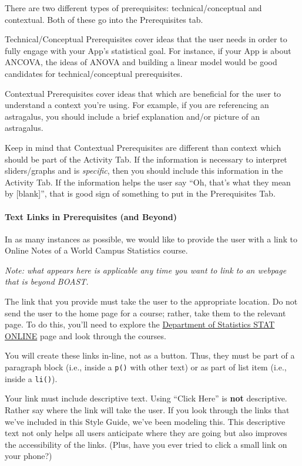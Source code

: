 \documentclass[
]{book}
\begin{document}
There are two different types of prerequisites: technical/conceptual and contextual. Both of these go into the Prerequisites tab.

Technical/Conceptual Prerequisites cover ideas that the user needs in order to fully engage with your App's statistical goal. For instance, if your App is about ANCOVA, the ideas of ANOVA and building a linear model would be good candidates for technical/conceptual prerequisites.

Contextual Prerequisites cover ideas that which are beneficial for the user to understand a context you're using. For example, if you are referencing an astragalus, you should include a brief explanation and/or picture of an astragalus.

Keep in mind that Contextual Prerequisites are different than context which should be part of the Activity Tab. If the information is necessary to interpret sliders/graphs and is \emph{specific}, then you should include this information in the Activity Tab. If the information helps the user say ``Oh, that's what they mean by {[}blank{]}'', that is good sign of something to put in the Prerequisites Tab.

\hypertarget{text-links-in-prerequisites-and-beyond}{%
\paragraph{Text Links in Prerequisites (and Beyond)}\label{text-links-in-prerequisites-and-beyond}}

In as many instances as possible, we would like to provide the user with a link to Online Notes of a World Campus Statistics course.

\emph{Note: what appears here is applicable any time you want to link to an webpage that is beyond BOAST.}

The link that you provide must take the user to the appropriate location. Do not send the user to the home page for a course; rather, take them to the relevant page. To do this, you'll need to explore the \href{https://online.stat.psu.edu/statprogram/}{Department of Statistics STAT ONLINE} page and look through the courses.

You will create these links in-line, not as a button. Thus, they must be part of a paragraph block (i.e., inside a \texttt{p()} with other text) or as part of list item (i.e., inside a \texttt{li()}).

Your link must include descriptive text. Using ``Click Here'' is \textbf{not} descriptive. Rather say where the link will take the user. If you look through the links that we've included in this Style Guide, we've been modeling this. This descriptive text not only helps all users anticipate where they are going but also improves the accessibility of the links. (Plus, have you ever tried to click a small link on your phone?)
\end{document}
